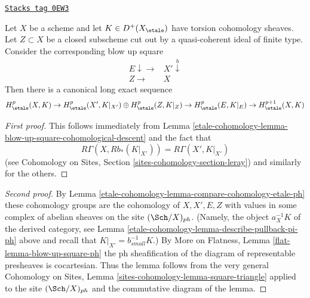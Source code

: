 \begin{lemma}
\label{etale-cohomology-lemma-blow-up-square-etale-cohomology}
\href{https://stacks.math.columbia.edu/tag/0EW3}{\texttt{Stacks tag 0EW3}}

Let $X$ be a scheme and let $K \in D^+(X_\etale)$ have
torsion cohomology sheaves. Let $Z \subset X$ be a closed subscheme
cut out by a quasi-coherent ideal of finite type. Consider the
corresponding blow up square
$$
\begin{array}{cc}E \downarrow\longrightarrow & X' \overset{b}{\downarrow} \\ Z \longrightarrow & X\end{array}
$$
Then there is a canonical long exact sequence
$$
H^p_\etale(X, K) \to
H^p_\etale(X', K|_{X'}) \oplus
H^p_\etale(Z, K|_Z) \to
H^p_\etale(E, K|_E) \to
H^{p + 1}_\etale(X, K)
$$
\end{lemma}

\begin{proof}[First proof]
This follows immediately from
Lemma \ref{etale-cohomology-lemma-blow-up-square-cohomological-descent}
and the fact that
$$
R\Gamma(X, Rb_*(K|_{X'})) = R\Gamma(X', K|_{X'})
$$
(see Cohomology on Sites, Section \ref{sites-cohomology-section-leray})
and similarly for the others.
\end{proof}

\begin{proof}[Second proof]
By Lemma \ref{etale-cohomology-lemma-compare-cohomology-etale-ph}
these cohomology groups are the cohomology of
$X, X', E, Z$ with values in some complex of abelian sheaves
on the site $(\Sch/X)_{ph}$. (Namely, the object
$a_X^{-1}K$ of the derived category, see
Lemma \ref{etale-cohomology-lemma-describe-pullback-pi-ph} above
and recall that $K|_{X'} = b_{small}^{-1}K$.)
By More on Flatness, Lemma \ref{flat-lemma-blow-up-square-ph}
the ph sheafification of the diagram of representable
presheaves is cocartesian. Thus the lemma follows from the very general
Cohomology on Sites, Lemma \ref{sites-cohomology-lemma-square-triangle}
applied to the site $(\Sch/X)_{ph}$ and the commutative diagram
of the lemma.
\end{proof}

